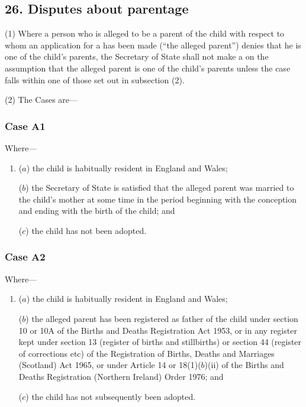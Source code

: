 \documentclass[a4paper]{article}
\begin{document}
\subsection{26. Disputes about parentage}

(1) Where a person who is alleged to be a parent of the child with respect to whom an application for a  has
been made (“the alleged parent”) denies that he is one of the child’s parents,
the Secretary of State shall not make a  on the assumption that the alleged parent is one of the
child’s parents unless the case falls within one of those set out in subsection (2).

(2) The Cases are---

\subsubsection*{Case A1}

Where---
\begin{enumerate}\item[]
($a$) the child is habitually resident in England and Wales;

($b$) the Secretary of State is satisfied that the alleged parent was married to
the child's mother at some time in the period beginning with the conception
and ending with the birth of the child; and

($c$) the child has not been adopted.
\end{enumerate}

\subsubsection*{Case A2}

Where---
\begin{enumerate}\item[]
($a$) the child is habitually resident in England and Wales;

($b$)
the alleged parent has been registered as father of the child under section 10 or 10A of the Births and Deaths Registration Act 1953, or in any register kept under section 13 (register of births and stillbirths) or section 44 (register of corrections etc) of the Registration of Births, Deaths and Marriages (Scotland) Act 1965, or under Article 14 or 18(1)($b$)(ii) of the Births and Deaths Registration (Northern Ireland) Order 1976; and

($c$)
the child has not subsequently been adopted.
\end{enumerate}
\end{document}
